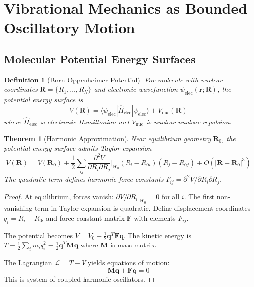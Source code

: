 \documentclass[twocolumn,10pt]{article}
\newtheorem{theorem}{Theorem}[section]
\newtheorem{definition}{Definition}[section]
\begin{document}
\section{Vibrational Mechanics as Bounded Oscillatory Motion}

\subsection{Molecular Potential Energy Surfaces}

\begin{definition}[Born-Oppenheimer Potential]
For molecule with nuclear coordinates $\mathbf{R} = \{R_1, \ldots, R_N\}$ and electronic wavefunction $\psi_{\text{elec}}(\mathbf{r}; \mathbf{R})$, the potential energy surface is
\begin{equation}
V(\mathbf{R}) = \langle \psi_{\text{elec}} | \hat{H}_{\text{elec}} | \psi_{\text{elec}} \rangle + V_{\text{nuc}}(\mathbf{R})
\end{equation}
where $\hat{H}_{\text{elec}}$ is electronic Hamiltonian and $V_{\text{nuc}}$ is nuclear-nuclear repulsion.
\end{definition}

\begin{theorem}[Harmonic Approximation]
\label{thm:harmonic_approximation}
Near equilibrium geometry $\mathbf{R}_0$, the potential energy surface admits Taylor expansion
\begin{equation}
V(\mathbf{R}) = V(\mathbf{R}_0) + \frac{1}{2}\sum_{ij} \frac{\partial^2 V}{\partial R_i \partial R_j}\bigg|_{\mathbf{R}_0} (R_i - R_{0i})(R_j - R_{0j}) + O(|\mathbf{R} - \mathbf{R}_0|^3)
\end{equation}
The quadratic term defines harmonic force constants $F_{ij} = \partial^2 V/\partial R_i \partial R_j$.
\end{theorem}

\begin{proof}
At equilibrium, forces vanish: $\partial V/\partial R_i|_{\mathbf{R}_0} = 0$ for all $i$. The first non-vanishing term in Taylor expansion is quadratic. Define displacement coordinates $q_i = R_i - R_{0i}$ and force constant matrix $\mathbf{F}$ with elements $F_{ij}$.

The potential becomes $V = V_0 + \frac{1}{2}\mathbf{q}^T \mathbf{F} \mathbf{q}$. The kinetic energy is $T = \frac{1}{2}\sum_i m_i \dot{q}_i^2 = \frac{1}{2}\dot{\mathbf{q}}^T \mathbf{M} \dot{\mathbf{q}}$ where $\mathbf{M}$ is mass matrix.

The Lagrangian $\mathcal{L} = T - V$ yields equations of motion:
\begin{equation}
\mathbf{M}\ddot{\mathbf{q}} + \mathbf{F}\mathbf{q} = 0
\end{equation}
This is system of coupled harmonic oscillators.
\end{proof}
\end{document}
